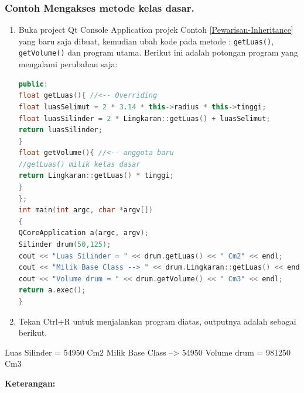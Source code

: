 \subsubsection*{Contoh  Mengakses metode kelas dasar.}

\begin{enumerate}

\item
  Buka project Qt Console Application projek Contoh \ref{Pewarisan-Inheritance} yang baru saja
  dibuat, kemudian ubah kode pada metode : \texttt{getLuas()},
  \texttt{getVolume()} dan program utama. Berikut ini adalah potongan
  program yang mengalami perubahan saja:

\begin{lstlisting}[language=c++, caption=Mengakses metode kelas dasar]
public:
float getLuas(){ //<-- Overriding
float luasSelimut = 2 * 3.14 * this->radius * this->tinggi;
float luasSilinder = 2 * Lingkaran::getLuas() + luasSelimut;
return luasSilinder;
}
float getVolume(){ //<-- anggota baru
//getLuas() milik kelas dasar
return Lingkaran::getLuas() * tinggi;
}
};
int main(int argc, char *argv[])
{
QCoreApplication a(argc, argv);
Silinder drum(50,125);
cout << "Luas Silinder = " << drum.getLuas() << " Cm2" << endl;
cout << "Milik Base Class --> " << drum.Lingkaran::getLuas() << endl;
cout << "Volume drum = " << drum.getVolume() << " Cm3" << endl;
return a.exec();
}
\end{lstlisting}
\item
  Tekan Ctrl+R untuk menjalankan program diatas, outputnya adalah
  sebagai berikut.
\end{enumerate}

\begin{lcverbatim}
Luas Silinder = 54950 Cm2
Milik Base Class --> 54950
Volume drum = 981250 Cm3
\end{lcverbatim}

\textbf{Keterangan:}

